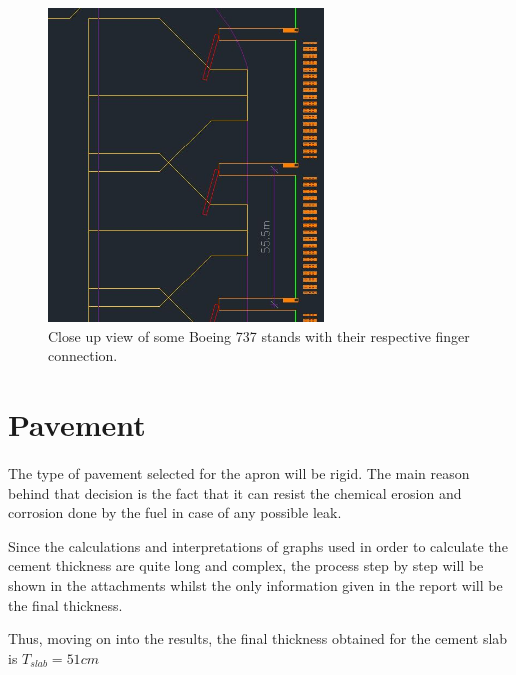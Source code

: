 	\begin{figure}[H]
		\centering
		\includegraphics[clip, trim=0cm 0cm 0cm 0cm, angle=270, width=0.65\textwidth]{./images/serviceway/fingercloseup}
		\caption{Close up view of some Boeing 737 stands with their respective finger connection.} %
		\label{} %
	\end{figure} 

	\section{Pavement}
	\paragraph{} The type of pavement selected for the apron will be rigid. The main reason behind that decision is the fact that it can resist the chemical erosion and corrosion done by the fuel in case of any possible leak.
	
	Since the calculations and interpretations of graphs used in order to calculate the cement thickness are quite long and complex, the process step by step will be shown in the attachments whilst the only information given in the report will be the final thickness. 
	
	Thus, moving on into the results, the final thickness obtained for the cement slab is \(T_{slab}=51cm\) 